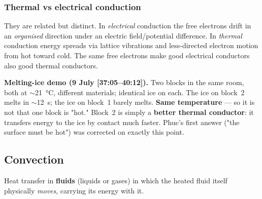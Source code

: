 \documentclass[11pt,a4paper]{article}
\newcommand{\ts}[1]{\textup{[#1]}}       %
\begin{document}
\begin{center}
\end{center}

\subsubsection{Thermal vs electrical conduction}
They are related but distinct. In \emph{electrical} conduction the free electrons drift in
an \emph{organised} direction under an electric field/potential difference. In
\emph{thermal} conduction energy spreads via lattice vibrations and less-directed electron
motion from hot toward cold. The same free electrons make good electrical conductors also
good thermal conductors.

\begin{watchbox}
\textbf{Melting-ice demo (9 July \ts{37:05--40:12}).} Two blocks in the same room, both at
$\sim$\SI{21}{\celsius}, different materials; identical ice on each. The ice on block~2
melts in $\sim$\SI{12}{s}; the ice on block~1 barely melts. \textbf{Same temperature} ---
so it is not that one block is "hot." Block~2 is simply a \textbf{better thermal
conductor}: it transfers energy to the ice by contact much faster. Phuc's first answer
("the surface must be hot") was corrected on exactly this point.
\end{watchbox}

\subsection{Convection}

\begin{defbox}[Convection]
Heat transfer in \textbf{fluids} (liquids or gases) in which the heated fluid itself
physically \emph{moves}, carrying its energy with it.
\end{defbox}
\end{document}
